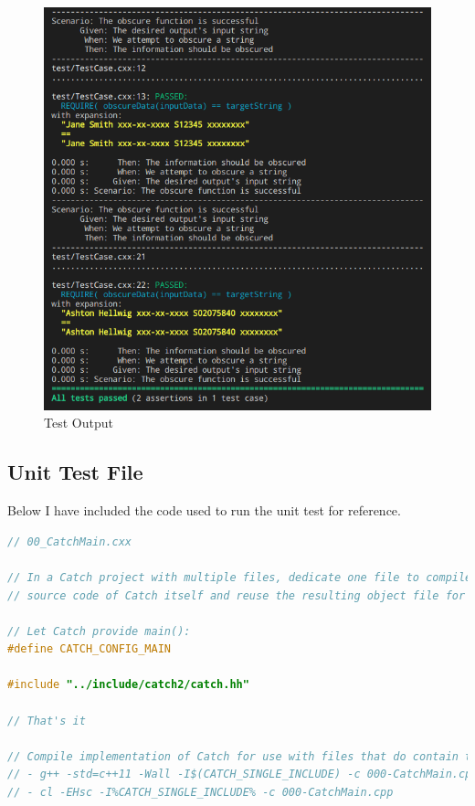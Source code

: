 \documentclass[a4paper, 11pt]{article}
\theoremstyle{definition}
\theoremstyle{plain}
\begin{document}
    \begin{figure}[H]
      \caption{Test Output}
      \centering
      \includegraphics[width=\textwidth]{testout.png}
    \end{figure}

    \newpage
    \subsection{Unit Test File}
      Below I have included the code used to run the unit test for reference.

      \begin{lstlisting}[language=c++,caption={00\_CatchMain.cxx}]
// 00_CatchMain.cxx

// In a Catch project with multiple files, dedicate one file to compile the
// source code of Catch itself and reuse the resulting object file for linking.

// Let Catch provide main():
#define CATCH_CONFIG_MAIN

#include "../include/catch2/catch.hh"

// That's it

// Compile implementation of Catch for use with files that do contain tests:
// - g++ -std=c++11 -Wall -I$(CATCH_SINGLE_INCLUDE) -c 000-CatchMain.cpp
// - cl -EHsc -I%CATCH_SINGLE_INCLUDE% -c 000-CatchMain.cpp
      \end{lstlisting}
\end{document}
